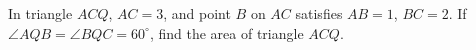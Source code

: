 In triangle $ACQ$, $AC=3$, and point $B$ on $AC$ satisfies $AB=1$, $BC=2$. If $\angle AQB=\angle BQC=60^\circ$, find the area of triangle $ACQ$.
